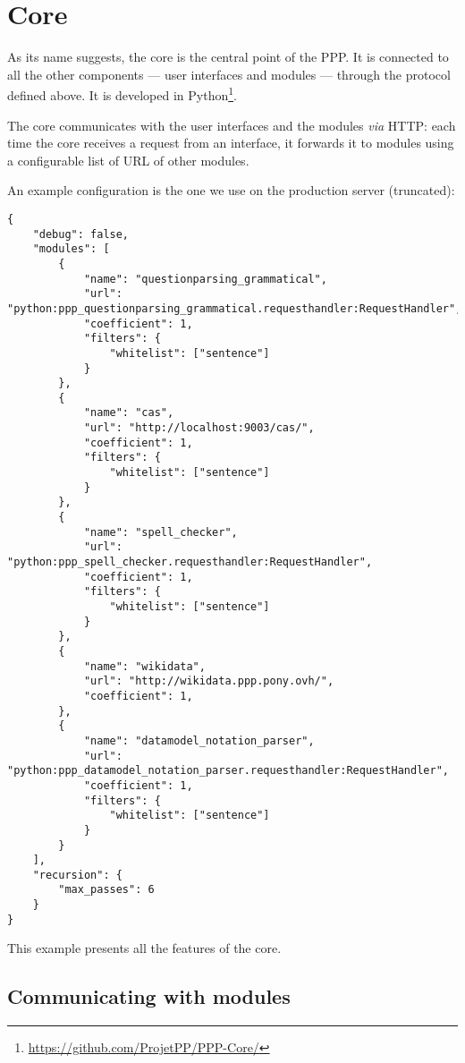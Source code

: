 \section{Core}

As its name suggests, the core is the central point of the PPP. It is
connected to all the other components — user interfaces and modules — through
the protocol defined above. It is developed in Python\footnote{\url{https://github.com/ProjetPP/PPP-Core/}}.

The core communicates with the user interfaces and the modules {\em via} HTTP:
each time the core receives a request from an interface, it forwards it
to modules using a configurable list of URL of other modules.

An example configuration is the one we use on the production server
(truncated):

\begin{verbatim}
{
    "debug": false,
    "modules": [
        {
            "name": "questionparsing_grammatical",
            "url": "python:ppp_questionparsing_grammatical.requesthandler:RequestHandler",
            "coefficient": 1,
            "filters": {
                "whitelist": ["sentence"]
            }
        },
        {
            "name": "cas",
            "url": "http://localhost:9003/cas/",
            "coefficient": 1,
            "filters": {
                "whitelist": ["sentence"]
            }
        },
        {
            "name": "spell_checker",
            "url": "python:ppp_spell_checker.requesthandler:RequestHandler",
            "coefficient": 1,
            "filters": {
                "whitelist": ["sentence"]
            }
        },
        {
            "name": "wikidata",
            "url": "http://wikidata.ppp.pony.ovh/",
            "coefficient": 1,
        },
        {
            "name": "datamodel_notation_parser",
            "url": "python:ppp_datamodel_notation_parser.requesthandler:RequestHandler",
            "coefficient": 1,
            "filters": {
                "whitelist": ["sentence"]
            }
        }
    ],
    "recursion": {
        "max_passes": 6
    }
}
\end{verbatim}

This example presents all the features of the core.

\subsection{Communicating with modules}

